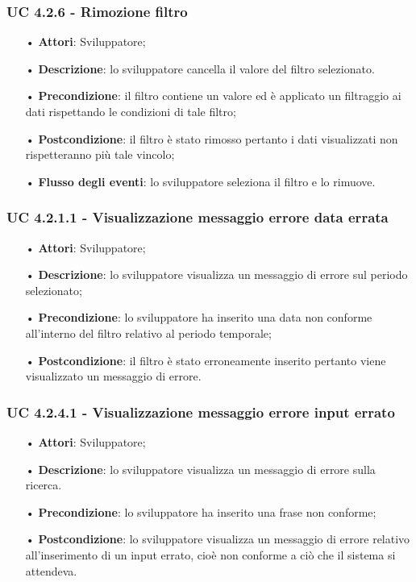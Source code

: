 \subsubsection{UC 4.2.6 - Rimozione filtro}
\begin{itemize}
\item[•]\textbf{Attori}: Sviluppatore;
\item[•]\textbf{Descrizione}: lo sviluppatore cancella il valore del filtro selezionato.
\item[•]\textbf{Precondizione}: il filtro contiene un valore ed è applicato un filtraggio ai dati rispettando le condizioni di tale filtro;
\item[•]\textbf{Postcondizione}: il filtro è stato rimosso pertanto i dati visualizzati non rispetteranno più tale vincolo;
\item[•]\textbf{Flusso degli eventi}: lo sviluppatore seleziona il filtro e lo rimuove.
 \end{itemize}

\subsubsection{UC 4.2.1.1 - Visualizzazione messaggio errore data errata}
\begin{itemize}
	\item[•]\textbf{Attori}: Sviluppatore;
	\item[•]\textbf{Descrizione}: lo sviluppatore visualizza un messaggio di errore sul periodo selezionato;
	\item[•]\textbf{Precondizione}: lo sviluppatore ha inserito una data non conforme all'interno del filtro relativo al periodo temporale;
	\item[•]\textbf{Postcondizione}: il filtro è stato erroneamente inserito pertanto viene visualizzato un messaggio di errore.
\end{itemize}
\subsubsection{UC 4.2.4.1 - Visualizzazione messaggio errore input errato}
\begin{itemize}
	\item[•]\textbf{Attori}: Sviluppatore;
	\item[•]\textbf{Descrizione}: lo sviluppatore visualizza un messaggio di errore sulla ricerca.
	\item[•]\textbf{Precondizione}: lo sviluppatore ha inserito una frase non conforme;
	\item[•]\textbf{Postcondizione}: lo sviluppatore visualizza un messaggio di errore relativo all'inserimento di un input errato, cioè non conforme a ciò che il sistema si attendeva.
\end{itemize}

